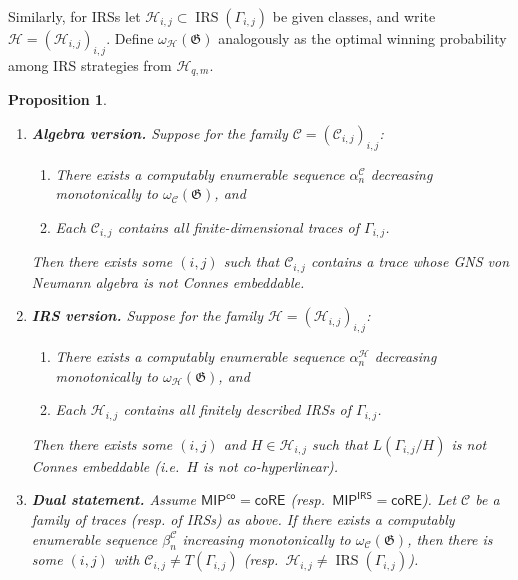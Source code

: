 \documentclass[pdflatex,sn-mathphys-num]{sn-jnl}%
\newtheorem{proposition}[theorem]{Proposition}
\newcommand{\IRS}{\operatorname{IRS}}
\begin{document}
Similarly, for IRSs let $\mathcal{H}_{i,j}\subset \IRS(\Gamma_{i,j})$ be given classes, and write
$\mathcal{H} = (\mathcal{H}_{i,j})_{i,j}$.  
Define $\omega_\mathcal{H}(\mathfrak{G})$ analogously as the optimal winning probability among IRS strategies from $\mathcal{H}_{q,m}$.

\begin{proposition}\label{prop:mip-nonemb}
\leavevmode
\begin{enumerate}
  \item[(A)] \textbf{Algebra version.}
  Suppose for the family $\mathcal{C}=(\mathcal{C}_{i,j})_{i,j}$:
  \begin{enumerate}
    \item[(i)] There exists a computably enumerable sequence $\alpha_n^{\mathcal{C}}$ decreasing monotonically to $\omega_{\mathcal{C}}(\mathfrak{G})$, and
    \item[(ii)] Each $\mathcal{C}_{i,j}$ contains all finite-dimensional traces of $\Gamma_{i,j}$.
  \end{enumerate}
  Then there exists some $(i,j)$ such that $\mathcal{C}_{i,j}$ contains a trace whose GNS von Neumann algebra is not Connes embeddable.

  \item[(B)] \textbf{IRS version.}
  Suppose for the family $\mathcal{H}=(\mathcal{H}_{i,j})_{i,j}$:
  \begin{enumerate}
    \item[(i$'$)] There exists a computably enumerable sequence $\alpha_n^{\mathcal{H}}$ decreasing monotonically to $\omega_{\mathcal{H}}(\mathfrak{G})$, and
    \item[(ii$'$)] Each $\mathcal{H}_{i,j}$ contains all finitely described IRSs of $\Gamma_{i,j}$.
  \end{enumerate}
  Then there exists some $(i,j)$ and $H\in\mathcal{H}_{i,j}$ such that $L(\Gamma_{i,j}/H)$ is not Connes embeddable (i.e.\ $H$ is not co-hyperlinear).

  \item[(C)] \textbf{Dual statement.}  
  Assume $\mathsf{MIP}^{\mathsf{co}}=\mathsf{coRE}$ (resp.\ $\mathsf{MIP}^{\mathsf{IRS}}=\mathsf{coRE}$).  
  Let $\mathcal{C}$ be a family of traces (resp. of IRSs) as above.  
  If there exists a computably enumerable sequence $\beta_n^\mathcal{C}$ increasing monotonically to $\omega_\mathcal{C}(\mathfrak{G})$, then there is some $(i,j)$ with $\mathcal{C}_{i,j}\neq T(\Gamma_{i,j})$ (resp.\ $\mathcal{H}_{i,j}\neq \IRS(\Gamma_{i,j})$).
\end{enumerate}
\end{proposition}
\end{document}
